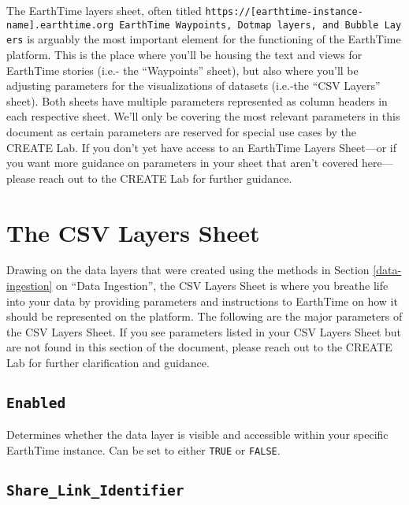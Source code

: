 \documentclass[
]{krantz}
\begin{document}
The EarthTime layers sheet, often titled \texttt{https://{[}earthtime-instance-name{]}.earthtime.org\ EarthTime\ Waypoints,\ Dotmap\ layers,\ and\ Bubble\ Layers} is arguably the most important element for the functioning of the EarthTime platform. This is the place where you'll be housing the text and views for EarthTime stories (i.e.- the ``Waypoints'' sheet), but also where you'll be adjusting parameters for the visualizations of datasets (i.e.-the ``CSV Layers'' sheet). Both sheets have multiple parameters represented as column headers in each respective sheet. We'll only be covering the most relevant parameters in this document as certain parameters are reserved for special use cases by the CREATE Lab. If you don't yet have access to an EarthTime Layers Sheet---or if you want more guidance on parameters in your sheet that aren't covered here---please reach out to the CREATE Lab for further guidance.

\hypertarget{the-csv-layers-sheet}{%
\section{The CSV Layers Sheet}\label{the-csv-layers-sheet}}

Drawing on the data layers that were created using the methods in Section \ref{data-ingestion} on ``Data Ingestion'', the CSV Layers Sheet is where you breathe life into your data by providing parameters and instructions to EarthTime on how it should be represented on the platform. The following are the major parameters of the CSV Layers Sheet. If you see parameters listed in your CSV Layers Sheet but are not found in this section of the document, please reach out to the CREATE Lab for further clarification and guidance.

\hypertarget{enabled}{%
\subsection*{\texorpdfstring{\texttt{Enabled}}{Enabled}}\label{enabled}}


Determines whether the data layer is visible and accessible within your specific EarthTime instance. Can be set to either \texttt{TRUE} or \texttt{FALSE}.

\hypertarget{share_link_identifier}{%
\subsection*{\texorpdfstring{\texttt{Share\_Link\_Identifier}}{Share\_Link\_Identifier}}\label{share_link_identifier}}
\end{document}
